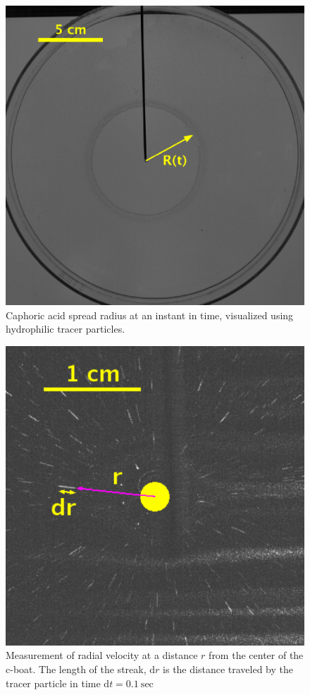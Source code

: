 \documentclass[aps, twocolumn, floatfix, superscriptaddress]{revtex4}
\newcommand{\td}[1]{\mathrm{d}#1}
\begin{document}
\begin{figure}[ht]
\centering
  \includegraphics[width=0.8\columnwidth]{figure2.pdf}
  \caption{Caphoric acid spread radius at an instant in time, visualized using hydrophilic tracer particles.}
  \label{fig:cspreadimg}
\end{figure}
\begin{figure}[ht]
  \centering
  \includegraphics[width=0.8\columnwidth]{figure3.pdf}
  \caption{Measurement of radial velocity at a distance $r$ from the center of the c-boat. The length of the streak, $\td{r}$ is the distance traveled by the tracer particle in time $\td{t} = 0.1\ \mathrm{sec}$}
       \label{fig:radvelimg}
\end{figure} 
\end{document}
